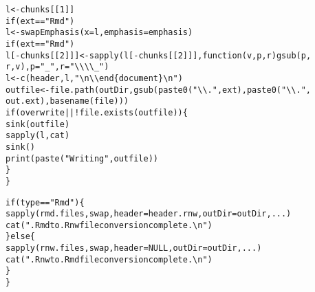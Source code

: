 \documentclass{article}\usepackage[]{graphicx}\usepackage[]{color}
\makeatletter
\newcommand{\hlnum}[1]{\textcolor[rgb]{0.863,0.196,0.184}{#1}}%
\newcommand{\hlstr}[1]{\textcolor[rgb]{0.863,0.196,0.184}{#1}}%
\newcommand{\hlopt}[1]{\textcolor[rgb]{0.576,0.631,0.631}{#1}}%
\newcommand{\hlstd}[1]{\textcolor[rgb]{0.514,0.58,0.588}{#1}}%
\newcommand{\hlkwa}[1]{\textcolor[rgb]{0.796,0.294,0.086}{#1}}%
\newcommand{\hlkwb}[1]{\textcolor[rgb]{0.522,0.6,0}{#1}}%
\newcommand{\hlkwc}[1]{\textcolor[rgb]{0.796,0.294,0.086}{#1}}%
\newcommand{\hlkwd}[1]{\textcolor[rgb]{0.576,0.631,0.631}{#1}}%
\newenvironment{kframe}{%
 \def\at@end@of@kframe{}%
 \ifinner\ifhmode%
  \def\at@end@of@kframe{\end{minipage}}%
  \begin{minipage}{\columnwidth}%
 \fi\fi%
 \def\FrameCommand##1{\hskip\@totalleftmargin \hskip-\fboxsep
 \colorbox{shadecolor}{##1}\hskip-\fboxsep
     \hskip-\linewidth \hskip-\@totalleftmargin \hskip\columnwidth}%
 \MakeFramed {\advance\hsize-\width
   \@totalleftmargin\z@ \linewidth\hsize
   \@setminipage}}%
 {\par\unskip\endMakeFramed%
 \at@end@of@kframe}
\newenvironment{knitrout}{}{} %
\makeatother
\begin{document}
\begin{knitrout}
\begin{kframe}
\begin{alltt}
        \hlstd{l} \hlkwb{<-} \hlstd{chunks[[}\hlnum{1}\hlstd{]]}
        \hlkwa{if} \hlstd{(ext} \hlopt{==} \hlstr{"Rmd"}\hlstd{)}
            \hlstd{l} \hlkwb{<-} \hlkwd{swapEmphasis}\hlstd{(}\hlkwc{x} \hlstd{= l,} \hlkwc{emphasis} \hlstd{= emphasis)}
        \hlkwa{if} \hlstd{(ext} \hlopt{==} \hlstr{"Rmd"}\hlstd{)}
            \hlstd{l[}\hlopt{-}\hlstd{chunks[[}\hlnum{2}\hlstd{]]]} \hlkwb{<-} \hlkwd{sapply}\hlstd{(l[}\hlopt{-}\hlstd{chunks[[}\hlnum{2}\hlstd{]]],} \hlkwa{function}\hlstd{(}\hlkwc{v}\hlstd{,} \hlkwc{p}\hlstd{,} \hlkwc{r}\hlstd{)} \hlkwd{gsub}\hlstd{(p,}
                \hlstd{r, v),} \hlkwc{p} \hlstd{=} \hlstr{"_"}\hlstd{,} \hlkwc{r} \hlstd{=} \hlstr{"\textbackslash{}\textbackslash{}\textbackslash{}\textbackslash{}_"}\hlstd{)}
        \hlstd{l} \hlkwb{<-} \hlkwd{c}\hlstd{(header, l,} \hlstr{"\textbackslash{}n\textbackslash{}\textbackslash{}end\{document\}\textbackslash{}n"}\hlstd{)}
        \hlstd{outfile} \hlkwb{<-} \hlkwd{file.path}\hlstd{(outDir,} \hlkwd{gsub}\hlstd{(}\hlkwd{paste0}\hlstd{(}\hlstr{"\textbackslash{}\textbackslash{}."}\hlstd{, ext),} \hlkwd{paste0}\hlstd{(}\hlstr{"\textbackslash{}\textbackslash{}."}\hlstd{,}
            \hlstd{out.ext),} \hlkwd{basename}\hlstd{(file)))}
        \hlkwa{if} \hlstd{(overwrite} \hlopt{|| !}\hlkwd{file.exists}\hlstd{(outfile)) \{}
            \hlkwd{sink}\hlstd{(outfile)}
            \hlkwd{sapply}\hlstd{(l, cat)}
            \hlkwd{sink}\hlstd{()}
            \hlkwd{print}\hlstd{(}\hlkwd{paste}\hlstd{(}\hlstr{"Writing"}\hlstd{, outfile))}
        \hlstd{\}}
    \hlstd{\}}

    \hlkwa{if} \hlstd{(type} \hlopt{==} \hlstr{"Rmd"}\hlstd{) \{}
        \hlkwd{sapply}\hlstd{(rmd.files, swap,} \hlkwc{header} \hlstd{= header.rnw,} \hlkwc{outDir} \hlstd{= outDir, ...)}
        \hlkwd{cat}\hlstd{(}\hlstr{".Rmd to .Rnw file conversion complete.\textbackslash{}n"}\hlstd{)}
    \hlstd{\}} \hlkwa{else} \hlstd{\{}
        \hlkwd{sapply}\hlstd{(rnw.files, swap,} \hlkwc{header} \hlstd{=} \hlkwa{NULL}\hlstd{,} \hlkwc{outDir} \hlstd{= outDir, ...)}
        \hlkwd{cat}\hlstd{(}\hlstr{".Rnw to .Rmd file conversion complete.\textbackslash{}n"}\hlstd{)}
    \hlstd{\}}
\hlstd{\}}
\end{alltt}
\end{kframe}
\end{knitrout}
\end{document}
